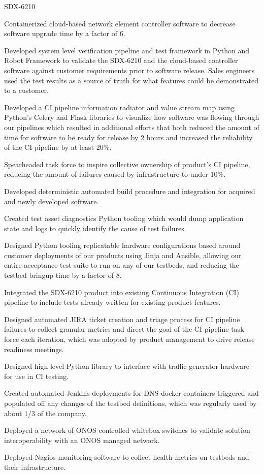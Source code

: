 \begin{cventries}
  \cventry
    {} {SDX-6210} {} {} {
      \begin{cvitems} %
        \item {Containerized cloud-based network element controller software to decrease software upgrade time by a factor of 6.}
        \item {Developed system level verification pipeline and test framework in Python and Robot Framework to validate the SDX-6210 and the cloud-based controller software against customer requirements prior to software release. Sales engineers used the test results as a source of truth for what features could be demonstrated to a customer.}
        \item {Developed a CI pipeline information radiator and value stream map using Python's Celery and Flask libraries to visualize how software was flowing through our pipelines which resulted in additional efforts that both reduced the amount of time for software to be ready for release by 2 hours and increased the reliability of the CI pipeline by at least 20\%.}
        \item {Spearheaded task force to inspire collective ownership of product's CI pipeline, reducing the amount of failures caused by infrastructure to under 10\%.}
        \item {Developed deterministic automated build procedure and integration for acquired and newly developed software.}
        \item {Created test asset diagnostics Python tooling which would dump application state and logs to quickly identify the cause of test failures.}
        \item {Designed Python tooling replicatable hardware configurations based around customer deployments of our products using Jinja and Ansible, allowing our entire acceptance test suite to run on any of our testbeds, and reducing the testbed bringup time by a factor of 8.}
        \item {Integrated the SDX-6210 product into existing Continuous Integration (CI) pipeline to include tests already written for existing product features.}
        \item {Designed automated JIRA ticket creation and triage process for CI pipeline failures to collect granular metrics and direct the goal of the CI pipeline task force each iteration, which was adopted by product management to drive release readiness meetings.}
        \item {Designed high level Python library to interface with traffic generator hardware for use in CI testing.}
        \item {Created automated Jenkins deployments for DNS docker containers triggered and populated off any changes of the testbed definitions, which was regularly used by about 1/3 of the company.}
        \item {Deployed a network of ONOS controlled whitebox switches to validate solution interoperability with an ONOS managed network.}
        \item {Deployed Nagios monitoring software to collect health metrics on testbeds and their infrastructure.}
      \end{cvitems}
    }


\end{cventries}
